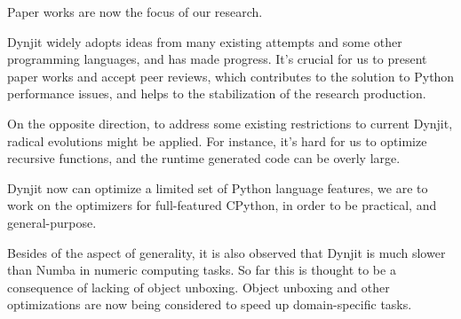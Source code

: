 \documentclass[conference]{IEEEtran}
\begin{document}
Paper works are now the focus of our research.

Dynjit widely adopts ideas from many existing attempts and some other programming languages, and has made progress.
It's crucial for us to present paper works and accept peer reviews, which contributes to the solution to Python performance issues,
and helps to the stabilization of the research production.

On the opposite direction, to address some existing restrictions to current Dynjit, radical evolutions might be applied.
For instance, it's hard for us to optimize recursive functions, and the runtime generated code can be overly large.

Dynjit now can optimize a limited set of Python language features, we are to work on the optimizers
for full-featured CPython, in order to be practical, and general-purpose.

Besides of the aspect of generality, it is also observed that Dynjit is much slower than Numba in numeric computing tasks.
So far this is thought to be a consequence of lacking of object unboxing. Object unboxing and
other optimizations are now being considered to speed up domain-specific tasks.

\medskip


\end{document}
